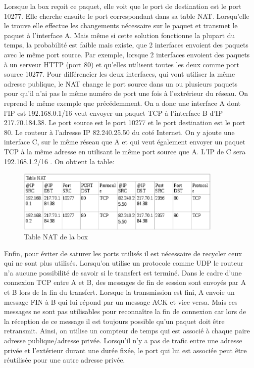Lorsque la box reçoit ce paquet, elle voit que le port de destination est le
port 10277. Elle cherche ensuite le port correspondant dans sa table NAT.
Lorsqu'elle le trouve elle effectue les changements nécessaire sur le paquet et
transmet le paquet à l'interface A.
\smallbreak
Mais même si cette solution fonctionne la plupart du temps, la probabilité est
faible mais existe, que 2 interfaces envoient des paquets avec le même port
source. Par exemple, lorsque 2 interfaces envoient des paquets à un serveur
HTTP (port 80) et qu'elles utilisent toutes les deux comme port source 10277.
Pour différencier les deux interfaces, qui vont utiliser la même adresse
publique, le NAT change le port source dans un ou plusieurs paquets pour qu'il
n'ai pas le même numéro de port une fois à l'extrérieur du réseau.  
\smallbreak
On reprend le même exemple que précédemment. On a donc une interface A dont l'IP
est 192.168.0.1/16 veut envoyer un paquet TCP à l'interface B d'IP 217.70.184.38.
Le port source est le port 10277 et le port destination est le port 80. Le
routeur à l'adresse IP  82.240.25.50 du coté Internet.
On y ajoute une interface C, sur le même réseau que A et qui veut également
envoyer un paquet TCP à la même adresse en utilisant le même port source que A. L'IP de C
sera 192.168.1.2/16 .
On obtient la table:

\begin{figure}[h]
\centering
\includegraphics[width=10cm]{./pics/TableNAT2.eps}
\caption{Table NAT de la box}
\label{fig:NAT2}
\end{figure}

Enfin, pour éviter de saturer les ports utilisés il est nécessaire de recycler
 ceux qui ne sont plus utilisés. Lorsqu'on utilise un protocole comme UDP le
routeur n'a aucune possibilité de savoir si le transfert est terminé. 
\smallbreak 
Dans le cadre d'une connexion TCP entre A et B, des messages de fin de
session sont envoyés par A et B lors de la fin du transfert. Lorsque la
transmission est fini, A envoie un message FIN à B qui lui répond par un
message ACK et vice versa. Mais ces messages ne sont pas utilisables pour
reconnaître la fin de connexion car lors de la réception de ce message il est
toujours possible qu'un paquet doit être retransmit. 
\smallbreak
Ainsi, on utilise un compteur de temps qui est associé à chaque paire adresse
publique/adresse privée. Lorsqu'il n'y a pas de trafic entre une adresse
privée et l'extérieur durant une durée fixée, le port qui lui est associée peut
être réutilisée pour une autre adresse privée.

